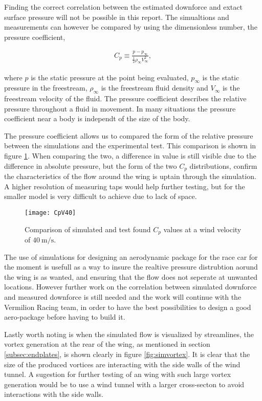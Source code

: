   Finding the correct correlation between the estimated downforce and extact surface pressure will not be possible in this report. The simualtions and measurements can however be compared by using the dimensionless number, the pressure coefficient,

  \begin{align}
    C_p \equiv \frac{p-p_{\infty}}{\frac{1}{2}\rho_{\infty}V_{\infty}^2},
  \end{align}

  where $p$ is the static pressure at the point being evaluated, $p_{\infty}$ is the static pressure in the freestream, $\rho_{\infty}$ is the freestream fluid density and $V_{\infty}$ is the freestream velocity of the fluid. The pressure coefficient describes the relative pressure throughout a fluid in movement. In many situations the pressure coefficient near a body is independt of the size of the body. 

  The pressure coefficient allows us to compared the form of the relative pressure between the simulations and the experimental test. This comparison is shown in figure \ref{fig:CpV40}. When comparing the two, a difference in value is still visible due to the difference in absolute pressure, but the form of the two $C_p$ distributions, confirm the characteristics of the flow around the wing is uptain through the simulation. A higher resolution of measuring taps would help further testing, but for the smaller model is very difficult to achieve due to lack of space. 

  \begin{figure}
    \texttt{[image: CpV40]}
    \caption{Comparison of simulated and test found $C_p$ values at a wind velocity of $\SI{40}{\metre\per\second}$.}
    \label{fig:CpV40}
  \end{figure}

  The use of simulations for designing an aerodynamic package for the race car for the moment is usefull as a way to insure the realtive pressure distrubtion aorund the wing is as wanted, and ensuring that the flow does not seperate at unwanted locations. However further work on the correlation between simulated downforce and measured downforce is still needed and the work will continue with the Vermilion Racing team, in order to have the best possibilities to design a good aero-package before having to build it.

  Lastly worth noting is when the simulated flow is visualized by streamlines, the vortex generation at the rear of the wing, as mentioned in section \ref{subsec:endplates}, is shown clearly in figure \ref{fig:simvortex}. It is clear that the size of the produced vortices are interacting with the side walls of the wind tunnel. A sugestion for further testing of an wing with such large vortex generation would be to use a wind tunnel with a larger cross-secton to avoid interactions with the side walls.

